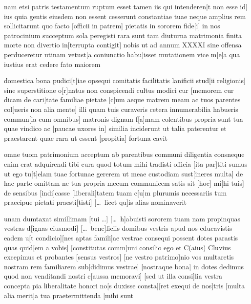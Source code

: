 nam etsi patris testamentum ruptum esset tamen iis qui intenderen[t non esse id] ius quia gentis eiusdem non essent cesserunt constantiae tuae neque amplius rem sollicitarunt quo facto [officii in patrem] pietatis in sororem fide[i] in nos patrocinium succeptum sola peregisti rara sunt tam diuturna matrimonia finita morte non divertio in[terrupta contigit] nobis ut ad annum XXXXI sine offensa perduceretur utinam vetust[a coniunctio habu]isset mutationem vice m[e]a qua iustius erat cedere fato maiorem 

domestica bona pudici[t]iae opsequi comitatis facilitatis lanificii stud[ii religionis] sine superstitione o[r]natus non conspicendi cultus modici cur [memorem cur dicam de cari]tate familiae pietate [c]um aeque matrem meam ac tuos parentes col[ueris non alia mente] illi quam tuis curaveris cetera innumerabilia habueris commun[ia cum omnibus] matronis dignam f[a]mam colentibus propria sunt tua quae vindico ac [paucae uxores in] similia inciderunt ut talia paterentur et praestarent quae rara ut essent [propitia] fortuna cavit

omne tuom patrimonium acceptum ab parentibus communi diligentia cons\-[ervavimus] neque enim erat adquirendi tibi cura quod totum mihi tradisti officia [ita par]titi sumus ut ego tu[t]elam tuae fortunae gererem ut meae custodiam sust[ineres multa] de hac parte omittam ne tua propria mecum communicem satis sit [hoc] mi[hi tuis] de sensibus [indi]casse [liberali]tatem tuam c[u]m plurumis necessariis tum praecipue pietati praesti[tisti] [\dots\ licet qu]is alias nominaverit 

unam dumtaxat simillimam [tui \dots] [\dots\ h]abuisti sororem tuam nam propinquas vestras d[ignas eiusmodi] [\dots\ bene]ficiis domibus vestris apud nos educavistis eadem u[t condicio][nes aptas famili]ae vestrae consequi possent dotes parastis quas quid[em a vobis] [constitutas comm]uni consilio ego et C(aius) Cluvius excepimus et probantes [sensus vestros] [ne vestro patrimo]nio vos multaretis nostram rem familiarem sub[didimus vestrae] [nostraque bona] in dotes dedimus quod non venditandi nostri c[aussa memoravi] [sed ut illa consi]lia vestra concepta pia liberalitate honori no[s duxisse consta][ret exequi de nos]tris [multa alia merit]a tua praetermittenda [mihi sunt 

